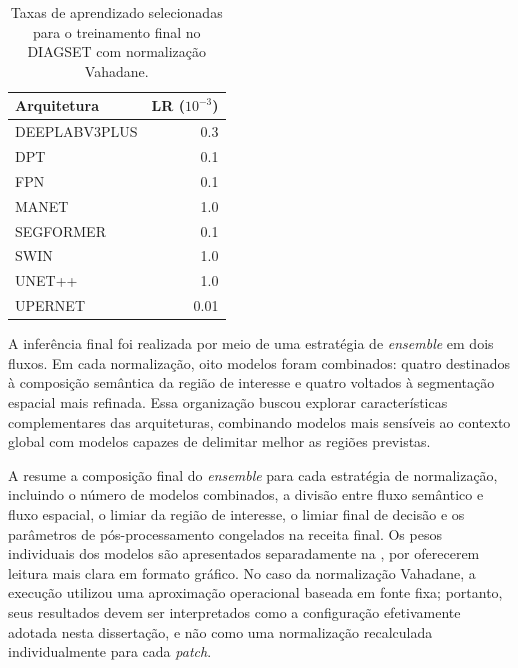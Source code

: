 \begin{table}[!htb]
\centering
\caption{Taxas de aprendizado selecionadas para o treinamento final no DIAGSET com normalização Vahadane.}
\label{tab:results_diagset-learning-rates-vahadane}
\begin{tabular}{lr}
\toprule
Arquitetura & LR ($10^{-3}$) \\
\midrule
DEEPLABV3PLUS & 0.3 \\
DPT & 0.1 \\
FPN & 0.1 \\
MANET & 1.0 \\
SEGFORMER & 0.1 \\
SWIN & 1.0 \\
UNET++ & 1.0 \\
UPERNET & 0.01 \\
\bottomrule
\end{tabular}
\end{table}

A inferência final foi realizada por meio de uma estratégia de \textit{ensemble} em dois fluxos. Em cada normalização, oito modelos foram combinados: quatro destinados à composição semântica da região de interesse e quatro voltados à segmentação espacial mais refinada. Essa organização buscou explorar características complementares das arquiteturas, combinando modelos mais sensíveis ao contexto global com modelos capazes de delimitar melhor as regiões previstas.

A  resume a composição final do \textit{ensemble} para cada estratégia de normalização, incluindo o número de modelos combinados, a divisão entre fluxo semântico e fluxo espacial, o limiar da região de interesse, o limiar final de decisão e os parâmetros de pós-processamento congelados na receita final. Os pesos individuais dos modelos são apresentados separadamente na , por oferecerem leitura mais clara em formato gráfico. No caso da normalização Vahadane, a execução utilizou uma aproximação operacional baseada em fonte fixa; portanto, seus resultados devem ser interpretados como a configuração efetivamente adotada nesta dissertação, e não como uma normalização recalculada individualmente para cada \textit{patch}.

